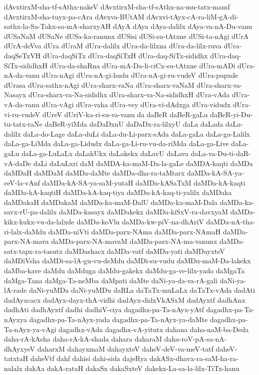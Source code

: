 {dAvxtirxM-sha-tf-sAthx-nakeV
dAvxtirxM-sha-tf-sAthx-na-mu-tatx-mamf
dAvxtirxM-sha-tuyx-pa-cAra
dAvxva-BUtAM
dAvxvi-tAyx-cA-ra-liM-gA-di-sathx-la-Sa-Takx-sa-mA-sharxyAH
dAyA
dAya
dAya-dalilx
dAya-va-nA-Du-vanu
dUSaNaM
dUSaNe
dUSa-ka-ranunx
dUSisi
dUSi-su-tAtxne
dUSi-ta-nAgi
dUrA
dUrA-deVva
dUra
dUraM
dUra-dalilx
dUra-da-lilxna
dUra-da-lilx-ruva
dUra-daqSeTxVH
dUra-daqSiTx
dUra-daqSiTxH
dUra-daq-SiTx-sididhx
dUra-daq-SiTx-sididhxH
dUra-da-shaRna
dUra-mA-Da-li-ciCx-su-tAtxne
dUra-mADi
dUra-nA-da-vanu
dUra-nAgi
dUra-nA-gi-hudu
dUra-nA-gi-ru-vudeV
dUra-pupxde
dUrasa
dUra-sathx-nAgi
dUra-sharx-vaNa
dUra-sharx-vaNaM
dUra-sharx-va-Nasayx
dUra-sharx-va-Na-sididhx
dUra-sharx-va-Na-sididhxH
dUra-vAda
dUra-vA-da-vanu
dUra-vAgi
dUra-vaha
dUra-vey
dUra-vi-dAdxga
dUra-vidudx
dUra-vi-ru-vudeV
dUreV
dUriV-ka-ri-su-va-vanu
da
daBeR
daBeR-gaLu
daBeR-yi-Du-tu-tatx-raNe
daBeR-yiMda
daDaDxnU
daDaDx-ra-lilxyU
daLa
daLada
daLa-dalilx
daLa-do-Lage
daLa-duLi
daLa-du-Li-parx-sAda
daLa-gaLa
daLa-ga-Lalilx
daLa-ga-LiMda
daLa-ga-Lidudx
daLa-ga-Li-ru-vu-da-riMda
daLa-ga-Live
daLa-gaLu
daLa-ga-LuLaLx
daLakUkx
daLakekx
daLavU
daLava
daLa-va-Du-ti-daR-vA-daDe
daLi
daLuLxri
daM
daMDA-ka-maM-Da-la-gaLe
daMDA-kaqti
daMDa
daMDaH
daMDaM
daMDa-daMte
daMDa-dha-ra-taMtarx
daMDa-kA-SA-ya-ceV-la-vAnf
daMDa-kA-SA-ya-saM-yutaH
daMDa-kASaTxM
daMDa-kA-kaqti
daMDa-kA-kaqtiH
daMDa-kA-kaq-tiya
daMDa-kA-kaq-ti-yalilx
daMDaka
daMDakaH
daMDakaM
daMDa-ka-maM-DalU
daMDa-ka-maM-Dala
daMDa-ka-savx-rU-pa-dalilx
daMDa-kasayx
daMDakekx
daMDa-kiSxV-ra-davxyaM
daMDa-kikx-kukx-vu-da-lalxde
daMDa-koVlu
daMDa-kw-piV-na-dhAriV
daMDa-nA-tha-ri-lalx-daMdu
daMDa-niVti
daMDa-parx-NAma
daMDa-parx-NAmaH
daMDa-parx-NA-mava
daMDa-parx-NA-mavaM
daMDa-parx-NA-ma-vanunx
daMDa-satx-tapx-ra-tasutx
daMDashacx
daMDa-vatf
daMDa-yati
daMDayxteV
daMDiVsha
daMDi-sa-lA-gu-vu-deMdu
daMDi-su-vudu
daMDu-maM-Da-lakekx
daMba-kave
daMdu
daMduga
daMdu-gakekx
daMdu-ga-ve-lilx-yado
daMgaTa
daMga-Tana
daMga-Ta-neMba
daMpati
daMte
daNi-ya-da-va-rA-gali
daNi-ya-lA-rade
daNi-yuMDa
daNi-yuMDu
daRLa
daTaTx-muLaLx
daTaTx-vAda
dadAti
dadAyxcacx
dadAyx-dayx-thA-vidhi
dadAyx-didxVkASxM
dadAyxtf
dadhAnx
dadhAti
dadhAyxtf
dadhi
dadhiV-ciya
dagadhx-pa-Ta-nAyx-yAtf
dagadhx-pa-Ta-nAyxya
dagadhx-pa-Ta-nAyx-yada
dagadhx-pa-Ta-nAyx-ya-daMte
dagadhx-pa-Ta-nAyx-ya-vAgi
dagadhx-vAda
dagadhx-vA-yitutx
dahana
daha-naM-ba-Deda
daha-rA-kAsha
daha-rA-kA-shada
dahara
daharaM
daha-roV-pA-sa-nA-dhAyxyeV
daharxM
dahayxmaM
dahayxteV
daheV-deV-va-meV-tatf
daheV-tatxtaH
daheVtf
dahf
dahisi
dahi-sida
dajeRya
dakASx-dhavx-ra-saM-ha-ra-nalalx
dakAa
dakA-rataH
dakaSx
dakaSxteV
dakekx-La-sa-la-lilx-TiTx-hanu
}
